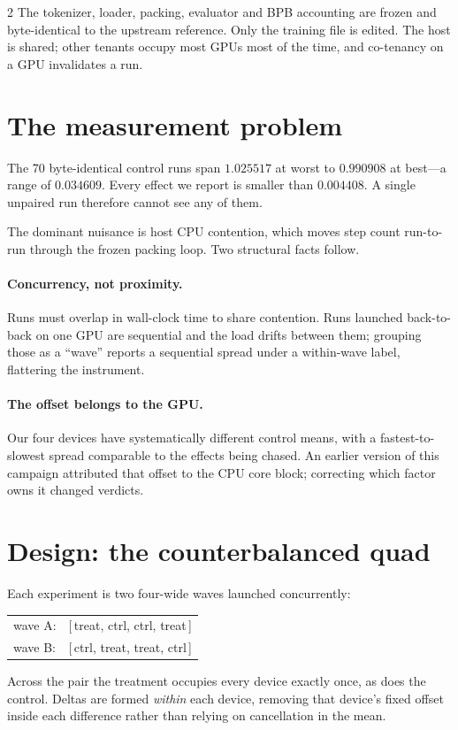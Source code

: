 \documentclass[10pt]{article}
\begin{document}
\begin{multicols}{2}
The tokenizer, loader, packing, evaluator and BPB accounting are frozen and byte-identical
to the upstream reference. Only the training file is edited. The host is shared; other
tenants occupy most GPUs most of the time, and co-tenancy on a GPU invalidates a run.

\section{The measurement problem}

The 70 byte-identical control runs span $1.025517$ at worst to $0.990908$ at best---a
range of $0.034609$. Every effect we report is smaller than $0.004408$. A single unpaired
run therefore cannot see any of them.

The dominant nuisance is host CPU contention, which moves step count run-to-run through
the frozen packing loop. Two structural facts follow.

\paragraph{Concurrency, not proximity.} Runs must overlap in wall-clock time to share
contention. Runs launched back-to-back on one GPU are sequential and the load drifts
between them; grouping those as a ``wave'' reports a sequential spread under a within-wave
label, flattering the instrument.

\paragraph{The offset belongs to the GPU.} Our four devices have systematically different
control means, with a fastest-to-slowest spread comparable to the effects being chased. An
earlier version of this campaign attributed that offset to the CPU core block; correcting
which factor owns it changed verdicts.

\section{Design: the counterbalanced quad}
\label{sec:design}

Each experiment is two four-wide waves launched concurrently:
\begin{center}\small
\begin{tabular}{ll}
wave A: & [\,treat, ctrl, ctrl, treat\,]\\
wave B: & [\,ctrl, treat, treat, ctrl\,]
\end{tabular}
\end{center}
Across the pair the treatment occupies every device exactly once, as does the control.
Deltas are formed \emph{within} each device, removing that device's fixed offset inside
each difference rather than relying on cancellation in the mean.


\end{multicols}
\end{document}
